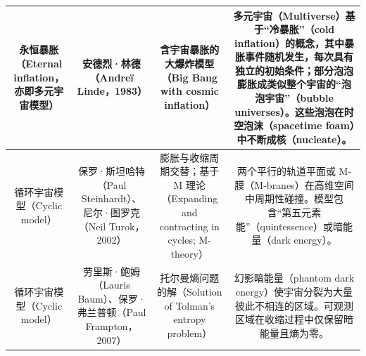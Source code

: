 \begin{table}[ht]
\begin{tabular}{|c|c|c|c|}
\hline
永恒暴胀（Eternal inflation，亦即多元宇宙模型）& 安德烈·林德（Andreï Linde，1983）& 含宇宙暴胀的大爆炸模型（Big Bang with cosmic inflation）& 多元宇宙（Multiverse）基于“冷暴胀”（cold inflation）的概念，其中暴胀事件随机发生，每次具有独立的初始条件；部分泡泡膨胀成类似整个宇宙的“泡泡宇宙”（bubble universes）。这些泡泡在时空泡沫（spacetime foam）中不断成核（nucleate）。\\
\hline
循环宇宙模型（Cyclic model）& 保罗·斯坦哈特（Paul Steinhardt）、尼尔·图罗克（Neil Turok，2002）& 膨胀与收缩周期交替；基于 M 理论（Expanding and contracting in cycles; M-theory）& 两个平行的轨道平面或 M-膜（M-branes）在高维空间中周期性碰撞。模型包含“第五元素能”（quintessence）或暗能量（dark energy）。\\
\hline
循环宇宙模型（Cyclic model）& 劳里斯·鲍姆（Lauris Baum）、保罗·弗兰普顿（Paul Frampton，2007）& 托尔曼熵问题的解（Solution of Tolman’s entropy problem）& 幻影暗能量（phantom dark energy）使宇宙分裂为大量彼此不相连的区域。可观测区域在收缩过程中仅保留暗能量且熵为零。\\
\hline
\end{tabular}
\end{table}

